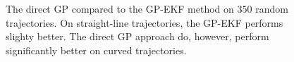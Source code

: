 \begin{figure}
    \centering
    \caption{The direct GP compared to the GP-EKF method on $350$ random trajectories. On straight-line trajectories, the GP-EKF performs slighty better. The direct GP approach do, however, perform significantly better on curved trajectories.}
    \label{fig:stats_posgp_cvm}


\end{figure}
